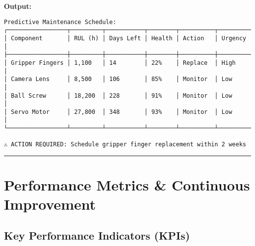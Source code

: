 \documentclass[
]{article}
\begin{document}
\textbf{Output:}

\begin{verbatim}
Predictive Maintenance Schedule:
┌─────────────────┬─────────┬───────────┬────────┬──────────┬─────────┐
│ Component       │ RUL (h) │ Days Left │ Health │ Action   │ Urgency │
├─────────────────┼─────────┼───────────┼────────┼──────────┼─────────┤
│ Gripper Fingers │ 1,100   │ 14        │ 22%    │ Replace  │ High    │
│ Camera Lens     │ 8,500   │ 106       │ 85%    │ Monitor  │ Low     │
│ Ball Screw      │ 18,200  │ 228       │ 91%    │ Monitor  │ Low     │
│ Servo Motor     │ 27,800  │ 348       │ 93%    │ Monitor  │ Low     │
└─────────────────┴─────────┴───────────┴────────┴──────────┴─────────┘

⚠ ACTION REQUIRED: Schedule gripper finger replacement within 2 weeks
\end{verbatim}

\begin{center}\rule{0.5\linewidth}{0.5pt}\end{center}

\hypertarget{performance-metrics-continuous-improvement}{%
\section{Performance Metrics \& Continuous
Improvement}\label{performance-metrics-continuous-improvement}}

\hypertarget{key-performance-indicators-kpis}{%
\subsection{Key Performance Indicators
(KPIs)}\label{key-performance-indicators-kpis}}
\end{document}
